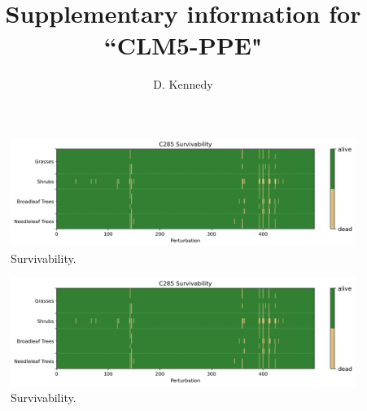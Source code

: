 \documentclass[11pt]{article}
\title{Supplementary information for ``CLM5-PPE"}
\author{D. Kennedy}
\begin{document}
\maketitle

\begin{figure}[h]
\centering
\includegraphics[width=\textwidth]{figs/supp/survivability_c285.png}
\caption{Survivability.}
\label{supp:surv}
\end{figure}


\begin{figure}[h]
\centering
\includegraphics[width=\textwidth]{figs/supp/survivability_c285.png}
\caption{Survivability.}
\label{supp:surv}
\end{figure}
\end{document}
